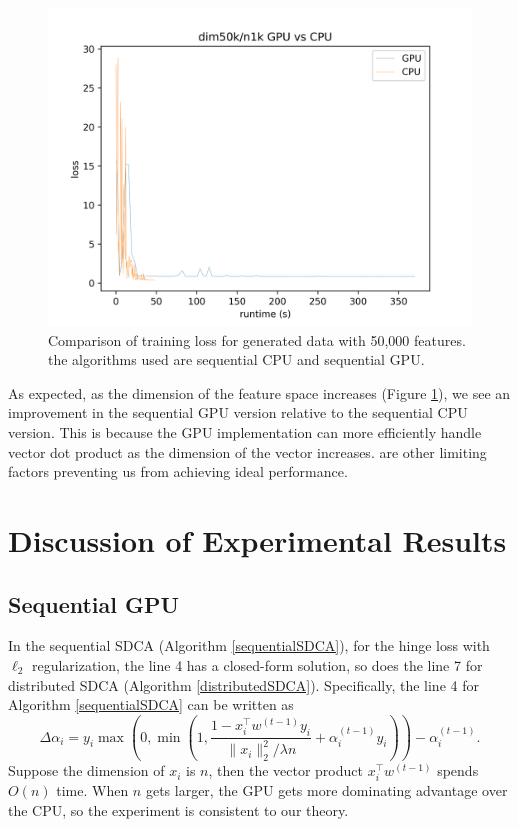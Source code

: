 \documentclass{article}
\begin{document}
\begin{figure}
	  \label{fig:50k}
  \centering
  \includegraphics[scale=0.65]{dim50k_CPU_GPU}
  \caption{Comparison of training loss for generated data with 50,000
    features. the algorithms used are sequential CPU and sequential GPU.}
  \end{figure}

As expected, as the dimension of the feature space increases (Figure
\ref{fig:50k}), we see an improvement in the sequential GPU version relative to
the sequential CPU version. This is because the GPU implementation can more
efficiently handle vector dot product as the dimension of the vector
increases.
are other limiting factors preventing us from achieving ideal performance.
  
\section{Discussion of Experimental Results}
\subsection{Sequential GPU}
In the sequential SDCA (Algorithm \ref{sequentialSDCA}), for the hinge loss
with $\ell_2$ regularization, the line 4 has a closed-form solution, so does
the line 7 for distributed SDCA (Algorithm \ref{distributedSDCA}).
Specifically, the line 4 for Algorithm \ref{sequentialSDCA} can be written as
\begin{equation*}
    \Delta\alpha_i=y_i\max\left(0,\min\left(1,\frac{1-x_i^\top
    w^{(t-1)}y_i}{\|x_i\|_2^2/\lambda
    n}+\alpha_i^{(t-1)}y_i\right)\right)-\alpha_i^{(t-1)}.
\end{equation*}
Suppose the dimension of $x_i$ is $n$, then the vector product $x_i^\top
w^{(t-1)}$ spends $O(n)$ time. When $n$ gets larger, the GPU gets more
dominating advantage over the CPU, so the experiment is consistent to our
theory.
\end{document}
